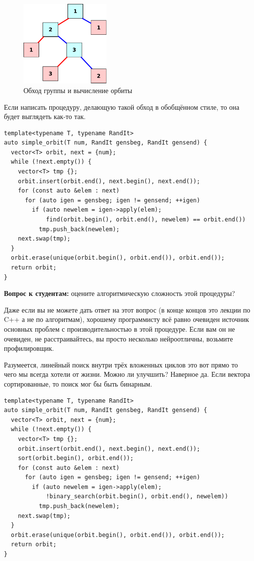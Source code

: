 \documentclass[a4paper,12pt,oneside]{book}
\newif\ifanswers
\begin{document}
\begin{figure}[ht]
\centering
\includegraphics[width=0.4\textwidth]{illustrations/group-traverse-crop.pdf}
\caption{Обход группы и вычисление орбиты}
\label{fig:group-traverse}
\end{figure}

Если написать процедуру, делающую такой обход в обобщённом стиле, то она будет выглядеть как-то так.

\begin{lstlisting}
template<typename T, typename RandIt>
auto simple_orbit(T num, RandIt gensbeg, RandIt gensend) {
  vector<T> orbit, next = {num};
  while (!next.empty()) {
    vector<T> tmp {};
    orbit.insert(orbit.end(), next.begin(), next.end());
    for (const auto &elem : next)
      for (auto igen = gensbeg; igen != gensend; ++igen)
        if (auto newelem = igen->apply(elem); 
            find(orbit.begin(), orbit.end(), newelem) == orbit.end())
          tmp.push_back(newelem);
    next.swap(tmp);
  }
  orbit.erase(unique(orbit.begin(), orbit.end()), orbit.end());
  return orbit;
}
\end{lstlisting}

\textbf{Вопрос к студентам:} оцените алгоритмическую сложность этой процедуры?

\ifanswers
Из-за внутреннего цикла это что-то вроде $O(N^{2}*r)$
\fi

Даже если вы не можете дать ответ на этот вопрос (в конце концов это лекции по C++ а не по алгоритмам), хорошему программисту всё равно очевиден источник основных проблем с производительностью в этой процедуре. Если вам он не очевиден, не расстраивайтесь, вы просто несколько нейроотличны, возьмите профилировщик.

Разумеется, линейный поиск внутри трёх вложенных циклов это вот прямо то чего мы всегда хотели от жизни. Можно ли улучшить? Наверное да. Если вектора сортированные, то поиск мог бы быть бинарным.

\begin{lstlisting}
template<typename T, typename RandIt>
auto simple_orbit(T num, RandIt gensbeg, RandIt gensend) {
  vector<T> orbit, next = {num};
  while (!next.empty()) {
    vector<T> tmp {};
    orbit.insert(orbit.end(), next.begin(), next.end());
    sort(orbit.begin(), orbit.end());
    for (const auto &elem : next)
      for (auto igen = gensbeg; igen != gensend; ++igen)
        if (auto newelem = igen->apply(elem); 
            !binary_search(orbit.begin(), orbit.end(), newelem))
          tmp.push_back(newelem);
    next.swap(tmp);
  }
  orbit.erase(unique(orbit.begin(), orbit.end()), orbit.end());
  return orbit;
}
\end{lstlisting}
\end{document}
